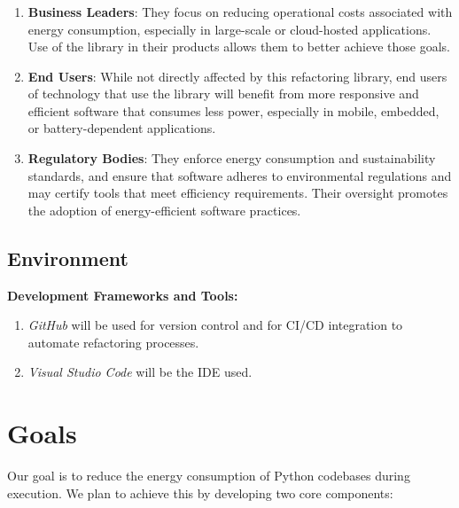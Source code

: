\documentclass{article}
\begin{document}
\subsubsection*{\color{blue}{Indirect Stakeholders}}
\begin{enumerate}

    \item \textbf{Business Leaders}: They focus on reducing operational costs associated with energy consumption, especially in large-scale or cloud-hosted applications. Use of the 
    library in their products allows them to better achieve those goals. 
    \item \textbf{End Users}: While not directly affected by this refactoring library, end users of technology that use the library will benefit from more responsive and efficient 
    software that consumes less power, especially in mobile, embedded, or battery-dependent applications. 
    \item \textbf{Regulatory Bodies}: They enforce energy consumption and sustainability standards, and ensure that software adheres to environmental regulations and may certify tools 
    that meet efficiency requirements. Their oversight promotes the adoption of energy-efficient software practices.

\end{enumerate}

\subsection{Environment}
\textbf{Development Frameworks and Tools:}
\begin{enumerate}

    \item \textit{GitHub} will be used for version control and for CI/CD integration to automate refactoring processes.
    \item \textit{Visual Studio Code} will be the IDE used.
    
\end{enumerate} 


\section{Goals}

Our goal is to reduce the energy consumption of Python codebases
during execution. We plan to achieve this by developing two core components:
\end{document}
